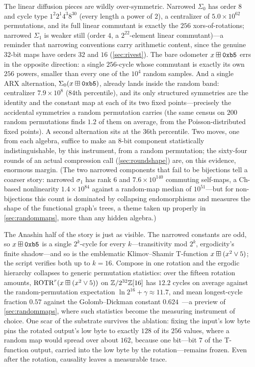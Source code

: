 The linear diffusion pieces are wildly over-symmetric. Narrowed
$\Sigma_0$ has order $8$ and cycle type $1^{2} 2^{1} 4^{3} 8^{30}$
(every length a power of $2$), a centralizer of $5.0\times10^{62}$
permutations, and its full linear commutant is exactly the $256$
xors-of-rotations; narrowed $\Sigma_1$ is weaker still (order $4$, a
$2^{22}$-element linear commutant)---a reminder that narrowing
conventions carry arithmetic content, since the genuine $32$-bit maps
have orders $32$ and $16$ (\cref{sec:rivest}). The bare odometer
$x \boxplus \mathtt{0xb5}$ errs in the opposite direction: a single
$256$-cycle whose commutant is exactly its own $256$ powers, smaller
than every one of the $10^{4}$ random samples. And a single ARX
alternation, $\Sigma_0(x \boxplus \mathtt{0xb5})$, already lands inside
the random band: centralizer $7.9\times10^{8}$ ($84$th percentile),
and its only structured symmetries are the identity and the constant
map at each of its two fixed points---precisely the accidental
symmetries a random permutation carries (the same census on $200$
random permutations finds $1.2$ of them on average, from the
Poisson-distributed fixed points). A second alternation sits at the
$36$th percentile. Two moves, one from each algebra, suffice to make
an $8$-bit component statistically indistinguishable, by this
instrument, from a random permutation; the sixty-four rounds of an
actual compression call (\cref{sec:roundshape}) are, on this evidence,
enormous margin. (The two narrowed components that fail to be
bijections tell a coarser story: narrowed $\sigma_1$ has rank $6$ and
$7.6\times10^{140}$ commuting self-maps, a Ch-based nonlinearity
$1.4\times10^{84}$ against a random-map median of $10^{51}$---but for
non-bijections this count is dominated by collapsing endomorphisms and
measures the shape of the functional graph's trees, a theme taken up
properly in \cref{sec:randommaps}, more than any hidden algebra.)

The Anashin half of the story is just as visible. The narrowed
constants are odd, so $x \boxplus \mathtt{0xb5}$ is a single
$2^{k}$-cycle for every $k$---transitivity mod $2^{k}$, ergodicity's
finite shadow---and so is the emblematic Klimov--Shamir T-function
$x \boxplus (x^{2} \vee 5)$; the script verifies both up to $k = 16$.
Compose in one rotation and the ergodic hierarchy collapses to generic
permutation statistics: over the fifteen rotation amounts,
$\mathrm{ROTR}^{r}(x \boxplus (x^{2} \vee 5))$ on $\mathbb{Z}/2^{32}\mathbb{Z}[16]$ has
$12.2$ cycles on average against the random-permutation expectation
$\ln 2^{16} + \gamma \approx 11.7$, and mean longest-cycle fraction
$0.57$ against the Golomb--Dickman constant
$0.624$~\citep{FlajoletOdlyzko1990}---a preview of
\cref{sec:randommaps}, where such statistics become the measuring
instrument of choice. One scar of the substrate survives the ablation:
fixing the input's low byte pins the rotated output's low byte to
exactly $128$ of its $256$ values, where a random map would spread
over about $162$, because one bit---bit $7$ of the T-function output,
carried into the low byte by the rotation---remains frozen. Even
after the rotation, causality leaves a measurable trace.


